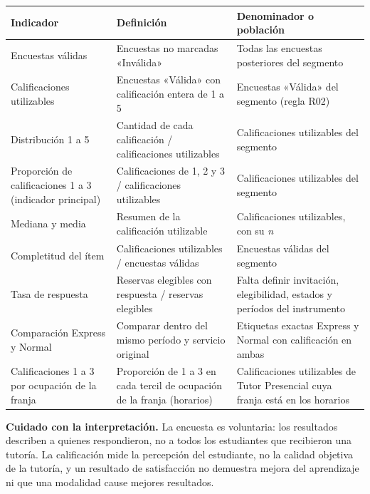 \documentclass[11pt,letterpaper]{article}
\begin{document}
\begingroup\small\setlength{\tabcolsep}{4pt}\renewcommand{\arraystretch}{1.15}
\begin{longtable}{>{\raggedright\arraybackslash}p{}>{\raggedright\arraybackslash}p{}>{\raggedright\arraybackslash}p{}}
\toprule
\textbf{Indicador} & \textbf{Definición} & \textbf{Denominador o población} \\
\midrule
\endhead
Encuestas válidas & Encuestas no marcadas «Inválida» & Todas las encuestas posteriores del segmento \\
Calificaciones utilizables & Encuestas «Válida» con calificación entera de 1 a 5 & Encuestas «Válida» del segmento (regla R02) \\
Distribución 1 a 5 & Cantidad de cada calificación / calificaciones utilizables & Calificaciones utilizables del segmento \\
Proporción de calificaciones 1 a 3 (indicador principal) & Calificaciones de 1, 2 y 3 / calificaciones utilizables & Calificaciones utilizables del segmento \\
Mediana y media & Resumen de la calificación utilizable & Calificaciones utilizables, con su \emph{n} \\
Completitud del ítem & Calificaciones utilizables / encuestas válidas & Encuestas válidas del segmento \\
Tasa de respuesta & Reservas elegibles con respuesta / reservas elegibles & Falta definir invitación, elegibilidad, estados y períodos del instrumento \\
Comparación Express y Normal & Comparar dentro del mismo período y servicio original & Etiquetas exactas Express y Normal con calificación en ambas \\
Calificaciones 1 a 3 por ocupación de la franja & Proporción de 1 a 3 en cada tercil de ocupación de la franja (horarios) & Calificaciones utilizables de Tutor Presencial cuya franja está en los horarios \\
\bottomrule
\end{longtable}
\endgroup



\textbf{Cuidado con la interpretación.} La encuesta es voluntaria: los resultados describen a quienes respondieron, no a todos los estudiantes que recibieron una tutoría. La calificación mide la percepción del estudiante, no la calidad objetiva de la tutoría, y un resultado de satisfacción no demuestra mejora del aprendizaje ni que una modalidad cause mejores resultados.
\end{document}
